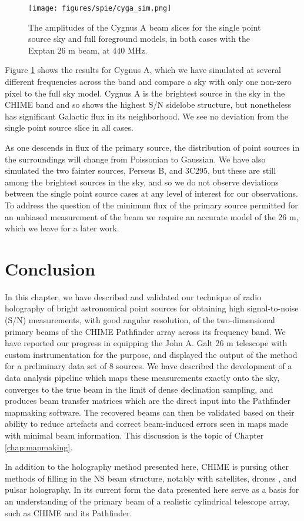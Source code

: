\begin{figure}[h!] %
	\centering	
	\texttt{[image: figures/spie/cyga\_sim.png]}%
	\caption{The amplitudes of the Cygnus A beam slices for the single point source sky and full foreground models, in both cases with the Exptan 26 m beam, at 440 MHz. }
	\label{cygasim}
\end{figure}

Figure \ref{cygasim} shows the results for Cygnus A, which we have simulated at several different frequencies across the band and compare a sky with only one non-zero pixel to the full sky model. Cygnus A is the brightest source in the sky in the CHIME band and so shows the highest S/N sidelobe structure, but nonetheless has significant Galactic flux in its neighborhood. We see no deviation from the single point source slice in all cases.

As one descends in flux of the primary source, the distribution of point sources in the surroundings will change from Poissonian to Gaussian. We have also simulated the two fainter sources, Perseus B, and 3C295, but these are still among the brightest sources in the sky, and so we do not observe deviations between the single point source cases at any level of interest for our observations. To address the question of the minimum flux of the primary source permitted for an unbiased measurement of the beam we require an accurate model of the 26 m, which we leave for a later work.

\section{Conclusion} \label{ch:hol:sec:conclusion}

In this chapter, we have described and validated our technique of radio holography of bright astronomical point sources for obtaining high signal-to-noise (S/N) measurements, with good angular resolution, of the two-dimensional primary beams of the CHIME Pathfinder array across its frequency band. We have reported our progress in equipping the John A. Galt 26 m telescope with custom instrumentation for the purpose, and displayed the output of the method for a preliminary data set of 8 sources. We have described the development of a data analysis pipeline which maps these measurements exactly onto the sky, converges to the true beam in the limit of dense declination sampling, and produces beam transfer matrices which are the direct input into the Pathfinder mapmaking software. The recovered beams can then be validated based on their ability to reduce artefacts and correct beam-induced errors seen in maps made with minimal beam information. This discussion is the topic of Chapter \ref{chap:mapmaking}.

In addition to the holography method presented here, CHIME is pursing other methods of filling in the NS beam structure, notably with satellites\citep{hol2, sat2}, drones \citep{drone}, and pulsar holography. In its current form the data presented here serve as a basis for an understanding of the primary beam of a realistic cylindrical telescope array, such as CHIME and its Pathfinder.
